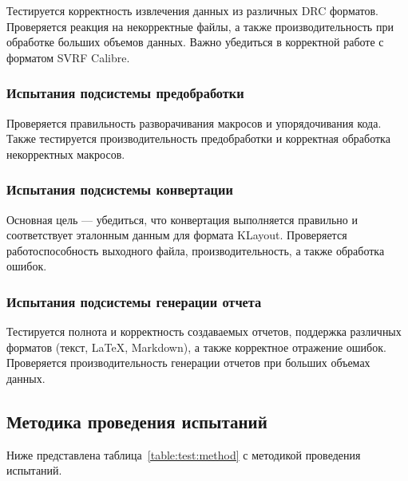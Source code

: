 Тестируется корректность извлечения данных из различных DRC форматов.
Проверяется реакция на некорректные файлы,
а также производительность при обработке больших объемов данных.
Важно убедиться в корректной работе с форматом SVRF Calibre.

\subsubsection{Испытания подсистемы предобработки}

Проверяется правильность разворачивания макросов и упорядочивания кода.
Также тестируется производительность предобработки
и корректная обработка некорректных макросов.

\subsubsection{Испытания подсистемы конвертации}

Основная цель --- убедиться, что конвертация выполняется правильно
и соответствует эталонным данным для формата KLayout.
Проверяется работоспособность выходного файла,
производительность, а также обработка ошибок.

\subsubsection{Испытания подсистемы генерации отчета}

Тестируется полнота и корректность создаваемых отчетов,
поддержка различных форматов (текст, LaTeX, Markdown),
а также корректное отражение ошибок.
Проверяется производительность генерации отчетов при больших объемах данных.

\clearpage  %

\subsection{Методика проведения испытаний}

Ниже представлена таблица~\ref{table:test:method}
с методикой проведения испытаний.

